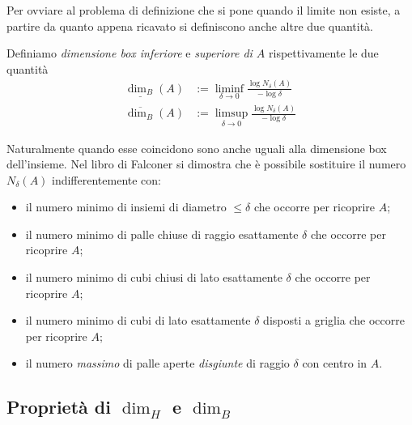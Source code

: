 Per ovviare al problema di definizione che si pone quando il limite non esiste, a partire da quanto appena ricavato si definiscono anche altre due quantità. 
\begin{definizione}
	Definiamo \emph{dimensione box inferiore} e \emph{superiore di $A$} rispettivamente le due quantità 
	\begin{align*}
		\underline{\dim_{B}}(A) &:= \liminf_{\delta\to0}\frac{\log N_{\delta}(A)}{-\log\delta}\\
		\overline{\dim_{B}}(A) &:= \limsup_{\delta\to0}\frac{\log N_{\delta}(A)}{-\log\delta}
	\end{align*}

\end{definizione}
Naturalmente quando esse coincidono sono anche uguali alla dimensione box dell'insieme.
Nel libro di Falconer si dimostra che è possibile sostituire il numero $N_{\delta}(A)$ indifferentemente con:
\begin{itemize}
	\item il numero minimo di insiemi di diametro $\leq\delta$ che occorre per ricoprire $A$;
	\item il numero minimo di palle chiuse di raggio esattamente $\delta$ che occorre per ricoprire $A$;
	\item il numero minimo di cubi chiusi di lato esattamente $\delta$ che occorre per ricoprire $A$;
	\item il numero minimo di cubi di lato esattamente $\delta$ disposti a griglia che occorre per ricoprire $A$;
	\item il numero \emph{massimo} di palle aperte \emph{disgiunte} di raggio $\delta$ con centro in $A$. 
\end{itemize}

\subsection{Proprietà di $\dim_{H}$ e $\dim_{B}$}


